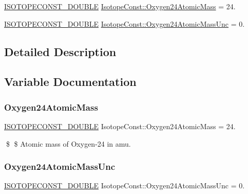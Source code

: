 \begin{DoxyCompactItemize}
\item 
\mbox{\hyperlink{group___isotope_const-_macros_ga8f45a7272ce02c0b4c65c44636ed719a}{I\+S\+O\+T\+O\+P\+E\+C\+O\+N\+S\+T\+\_\+\+D\+O\+U\+B\+LE}} \mbox{\hyperlink{group___isotope_const-_oxygen-_o24_gaf6c2d3e959efb87ff01fb3069e7fa8aa}{Isotope\+Const\+::\+Oxygen24\+Atomic\+Mass}} = 24.
\item 
\mbox{\hyperlink{group___isotope_const-_macros_ga8f45a7272ce02c0b4c65c44636ed719a}{I\+S\+O\+T\+O\+P\+E\+C\+O\+N\+S\+T\+\_\+\+D\+O\+U\+B\+LE}} \mbox{\hyperlink{group___isotope_const-_oxygen-_o24_ga34196513323a601dee51ea2cbdb19db0}{Isotope\+Const\+::\+Oxygen24\+Atomic\+Mass\+Unc}} = 0.
\end{DoxyCompactItemize}


\subsection{Detailed Description}


\subsection{Variable Documentation}
\mbox{\label{group___isotope_const-_oxygen-_o24_gaf6c2d3e959efb87ff01fb3069e7fa8aa}} 
\subsubsection{\texorpdfstring{Oxygen24\+Atomic\+Mass}{Oxygen24AtomicMass}}
{\footnotesize\ttfamily \mbox{\hyperlink{group___isotope_const-_macros_ga8f45a7272ce02c0b4c65c44636ed719a}{I\+S\+O\+T\+O\+P\+E\+C\+O\+N\+S\+T\+\_\+\+D\+O\+U\+B\+LE}} Isotope\+Const\+::\+Oxygen24\+Atomic\+Mass = 24.}

\$ \$ Atomic mass of Oxygen-\/24 in amu. \mbox{\label{group___isotope_const-_oxygen-_o24_ga34196513323a601dee51ea2cbdb19db0}} 
\subsubsection{\texorpdfstring{Oxygen24\+Atomic\+Mass\+Unc}{Oxygen24AtomicMassUnc}}
{\footnotesize\ttfamily \mbox{\hyperlink{group___isotope_const-_macros_ga8f45a7272ce02c0b4c65c44636ed719a}{I\+S\+O\+T\+O\+P\+E\+C\+O\+N\+S\+T\+\_\+\+D\+O\+U\+B\+LE}} Isotope\+Const\+::\+Oxygen24\+Atomic\+Mass\+Unc = 0.}

